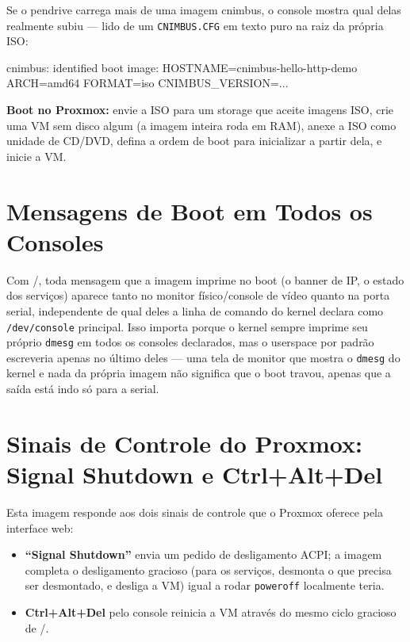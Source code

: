 \documentclass[11pt,letterpaper]{report}
\newcommand{\dashfix}[1]{\StrSubstitute{#1}{--}{-{}-}}
\newcommand{\flag}[1]{\texttt{\textbf{\dashfix{#1}}}}
\newcommand{\dir}[1]{\texttt{\textbf{\dashfix{#1}}}}
\begin{document}
Se o pendrive carrega mais de uma imagem cnimbus, o console mostra
qual delas realmente subiu --- lido de um \texttt{CNIMBUS.CFG} em
texto puro na raiz da própria ISO:

\begin{shell}
cnimbus: identified boot image:
HOSTNAME=cnimbus-hello-http-demo
ARCH=amd64
FORMAT=iso
CNIMBUS_VERSION=...
\end{shell}

\textbf{Boot no Proxmox:} envie a ISO para um storage que aceite
imagens ISO, crie uma VM sem disco algum (a imagem inteira roda em
RAM), anexe a ISO como unidade de CD/DVD, defina a ordem de boot para
inicializar a partir dela, e inicie a VM.

\section{Mensagens de Boot em Todos os Consoles}

Com \flag{--vga}/\dir{VGA true}, toda mensagem que a imagem imprime no
boot (o banner de IP, o estado dos serviços) aparece tanto no monitor
físico/console de vídeo quanto na porta serial, independente de qual
deles a linha de comando do kernel declara como \texttt{/dev/console}
principal. Isso importa porque o kernel sempre imprime seu próprio
\texttt{dmesg} em todos os consoles declarados, mas o userspace por
padrão escreveria apenas no último deles --- uma tela de monitor que
mostra o \texttt{dmesg} do kernel e nada da própria imagem não
significa que o boot travou, apenas que a saída está indo só para a
serial.

\section{Sinais de Controle do Proxmox: Signal Shutdown e Ctrl+Alt+Del}

Esta imagem responde aos dois sinais de controle que o Proxmox oferece
pela interface web:

\begin{itemize}
  \item \textbf{``Signal Shutdown''} envia um pedido de desligamento
    ACPI; a imagem completa o desligamento gracioso (para os serviços,
    desmonta o que precisa ser desmontado, e desliga a VM) igual a
    rodar \texttt{poweroff} localmente teria.
  \item \textbf{Ctrl+Alt+Del} pelo console reinicia a VM através do
    mesmo ciclo gracioso de \dir{RESTART}/\dir{STOPGRACE}.
\end{itemize}
\end{document}
